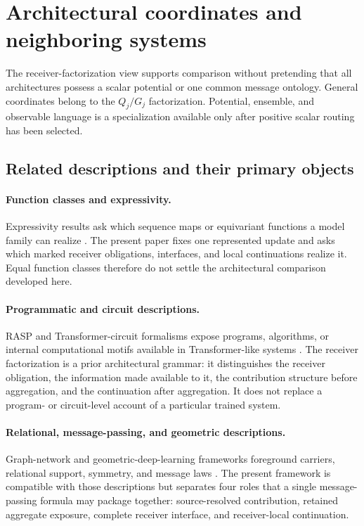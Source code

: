 \section{Architectural coordinates and neighboring systems}\label{sec:coordinates}

The receiver-factorization view supports comparison without pretending that all architectures possess a scalar potential or one common message ontology. General coordinates belong to the $Q_j/G_j$ factorization. Potential, ensemble, and observable language is a specialization available only after positive scalar routing has been selected.

\subsection{Related descriptions and their primary objects}

\paragraph{Function classes and expressivity.}
Expressivity results ask which sequence maps or equivariant functions a model family can realize \citep{yun2020transformers,hu2025softmax}. The present paper fixes one represented update and asks which marked receiver obligations, interfaces, and local continuations realize it. Equal function classes therefore do not settle the architectural comparison developed here.

\paragraph{Programmatic and circuit descriptions.}
RASP and Transformer-circuit formalisms expose programs, algorithms, or internal computational motifs available in Transformer-like systems \citep{weiss2021thinking,elhage2021framework}. The receiver factorization is a prior architectural grammar: it distinguishes the receiver obligation, the information made available to it, the contribution structure before aggregation, and the continuation after aggregation. It does not replace a program- or circuit-level account of a particular trained system.

\paragraph{Relational, message-passing, and geometric descriptions.}
Graph-network and geometric-deep-learning frameworks foreground carriers, relational support, symmetry, and message laws \citep{battaglia2018relational,gilmer2017neural,bronstein2021geometric}. The present framework is compatible with those descriptions but separates four roles that a single message-passing formula may package together: source-resolved contribution, retained aggregate exposure, complete receiver interface, and receiver-local continuation.

